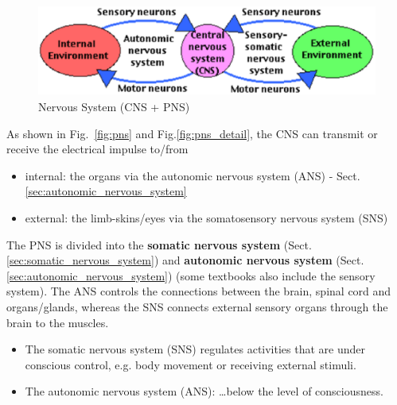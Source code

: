 \begin{figure}[h]
\centerline{\includegraphics[height=3cm]{./images/CNS-PNS.eps}}
\caption{Nervous System (CNS + PNS)}\label{fig:CNS-PNS}
\end{figure} 


As shown in Fig.~\ref{fig:pns} and Fig.\ref{fig:pns_detail}, the CNS can
transmit or receive the electrical impulse to/from
\begin{itemize}
  \item internal: the organs via the autonomic nervous system (ANS)  -
  Sect.\ref{sec:autonomic_nervous_system}
  
  \item external: the limb-skins/eyes via the somatosensory nervous system
  (SNS)
\end{itemize}
The PNS is divided into the {\bf somatic nervous system}
(Sect.\ref{sec:somatic_nervous_system}) and {\bf autonomic nervous system}
(Sect.\ref{sec:autonomic_nervous_system}) (some textbooks also include the
sensory system). The ANS controls the connections between the brain, spinal cord
and organs/glands, whereas the SNS connects external sensory organs through the
brain to the muscles.

\begin{itemize}
\item The somatic nervous system (SNS) regulates activities that are under
  conscious control, e.g. body movement or receiving external stimuli.
  
\item The autonomic nervous system (ANS): \ldots below the level of
consciousness.
\end{itemize}



%   
%   
%   
%   
%   


